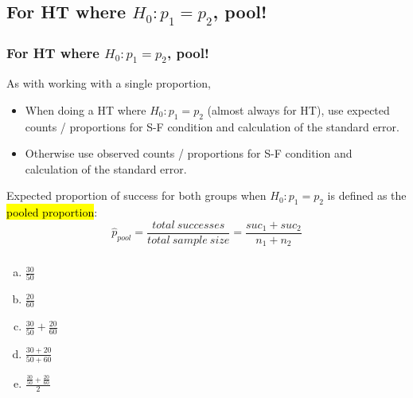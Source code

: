 \documentclass[slidestop,compress,mathserif,12pt,t,professionalfonts,xcolor=table]{beamer}
\newcommand{\solnMult}[1]{#1}
\begin{document}

\subsection{For HT where $H_0: p_1 = p_2$, pool!}
\label{mi2}


\begin{frame}
\frametitle{For HT where $H_0: p_1 = p_2$, pool!}

As with working with a single proportion,

\begin{itemize}

\item When doing a HT where $H_0: p_1 = p_2$ (almost always for HT), use expected counts / proportions for S-F condition and calculation of the standard error.

\item Otherwise use observed counts / proportions for S-F condition and calculation of the standard error.

\end{itemize}

\pause 

Expected proportion of success for both groups when $H_0: p_1 = p_2$ is defined as the \hl{pooled proportion}:
\[ \hat{p}_{pool} = \frac{total~successes}{total~sample~size} = \frac{suc_1 + suc_2}{n_1 + n_2} \]

\end{frame}


\begin{frame}
\frametitle{}


\begin{enumerate}[(a)]
\item $\frac{30}{50}$
\item $\frac{20}{60}$
\item $\frac{30}{50} + \frac{20}{60}$
\item \solnMult{$\frac{30 + 20}{50 + 60}$}
\item $\frac{\frac{30}{50} + \frac{20}{60}}{2}$
\end{enumerate}

\end{frame}
\end{document}
